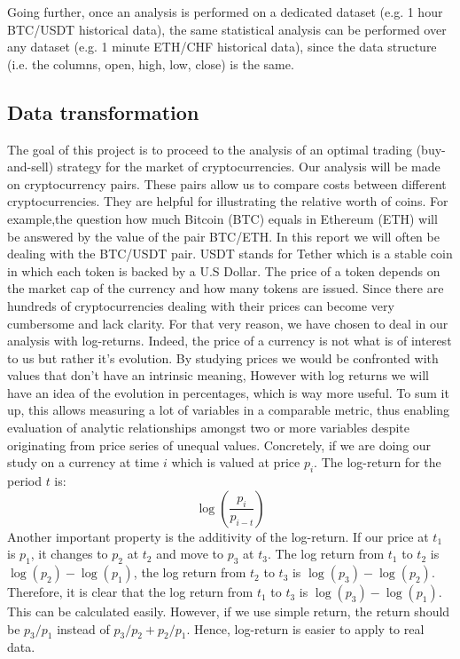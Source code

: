 \documentclass[twoside]{report}
\begin{document}
\begin{spacing}{1}
Going further, once an analysis is performed on a dedicated dataset (e.g. 1 hour BTC/USDT historical data), the same statistical analysis can be performed over any dataset (e.g. 1 minute ETH/CHF historical data), since the data structure (i.e. the columns, open, high, low, close) is the same.

\subsection{Data transformation}

The goal of this project is to proceed to the analysis of an optimal trading (buy-and-sell) strategy for the market of cryptocurrencies. Our analysis will be made on cryptocurrency pairs. These pairs allow us to compare costs between different cryptocurrencies. They are helpful for illustrating the relative worth of coins. For example,the question how much Bitcoin (BTC) equals in Ethereum (ETH) will be answered by the value of the pair BTC/ETH. In this report we will often be dealing with the BTC/USDT pair. USDT stands for Tether which is a stable coin in which each token is backed by a U.S Dollar.
The price of a token depends on the market cap of the currency and how many tokens are issued. Since there are hundreds of cryptocurrencies dealing with their prices can become very cumbersome and lack clarity. For that very reason, we have chosen to deal in our analysis with log-returns.
Indeed, the price of a currency is not what is of interest to us but rather it's evolution. By studying prices we would be confronted with values that don't have an intrinsic meaning, However with log returns we will have an idea of the evolution in percentages, which is way more useful. To sum it up, this allows measuring a lot of variables in a comparable metric, thus enabling evaluation of analytic relationships amongst two or more variables despite originating from price series of unequal values. 
Concretely, if we are doing our study on a currency at time $i$ which is valued at price $p_i$. The log-return for the period $t$ is:
\[
\log\left(\frac{p_i}{p_{i-t}}\right)
\]
Another important property is the additivity of the log-return. If our price at $t_1$ is $p_1$, it changes to $p_2$ at $t_2$ and move to $p_3$ at $t_3$. The log return from $t_1 $ to $t_2$ is $\log (p_2) - \log (p_1)$, the log return from $t_2 $ to $t_3$ is $\log (p_3) - \log (p_2)$. Therefore, it is clear that the log return from $t_1 $ to $t_3$ is $\log (p_3) - \log (p_1)$. This can be calculated easily. However, if we use simple return, the return should be $p_3/p_1$ instead of $p_3/p_2 + p_2/p_1$. Hence, log-return is easier to apply to real data.


\end{spacing}
\end{document}
